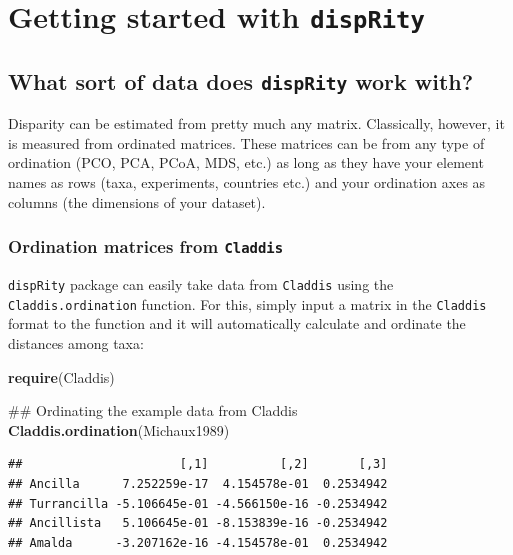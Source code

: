 \documentclass[]{book}
\newenvironment{Shaded}{\begin{snugshade}}{\end{snugshade}}
\newcommand{\KeywordTok}[1]{\textcolor[rgb]{0.13,0.29,0.53}{\textbf{#1}}}
\newcommand{\NormalTok}[1]{#1}
\theoremstyle{definition}
\theoremstyle{definition}
\theoremstyle{remark}
\begin{document}
\chapter{\texorpdfstring{Getting started with
\texttt{dispRity}}{Getting started with dispRity}}\label{getting-started-with-disprity}

\section{\texorpdfstring{What sort of data does \texttt{dispRity} work
with?}{What sort of data does dispRity work with?}}\label{what-sort-of-data-does-disprity-work-with}

Disparity can be estimated from pretty much any matrix. Classically,
however, it is measured from ordinated matrices. These matrices can be
from any type of ordination (PCO, PCA, PCoA, MDS, etc.) as long as they
have your element names as rows (taxa, experiments, countries etc.) and
your ordination axes as columns (the dimensions of your dataset).

\subsection{\texorpdfstring{Ordination matrices from
\texttt{Claddis}}{Ordination matrices from Claddis}}\label{ordination-matrices-from-claddis}

\texttt{dispRity} package can easily take data from \texttt{Claddis}
using the \texttt{Claddis.ordination} function. For this, simply input a
matrix in the \texttt{Claddis} format to the function and it will
automatically calculate and ordinate the distances among taxa:

\begin{Shaded}
\begin{Highlighting}[]
\KeywordTok{require}\NormalTok{(Claddis)}

\NormalTok{## Ordinating the example data from Claddis}
\KeywordTok{Claddis.ordination}\NormalTok{(Michaux1989) }
\end{Highlighting}
\end{Shaded}

\begin{verbatim}
##                      [,1]          [,2]       [,3]
## Ancilla      7.252259e-17  4.154578e-01  0.2534942
## Turrancilla -5.106645e-01 -4.566150e-16 -0.2534942
## Ancillista   5.106645e-01 -8.153839e-16 -0.2534942
## Amalda      -3.207162e-16 -4.154578e-01  0.2534942
\end{verbatim}
\end{document}
